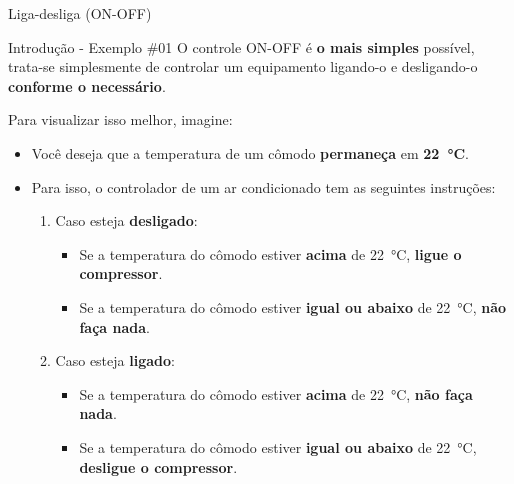\begin{frame}{Liga-desliga (ON-OFF)}
	\begin{block}{Introdução - Exemplo \#01}
		O controle ON-OFF é \textbf{o mais simples} possível, trata-se simplesmente de controlar um equipamento ligando-o e desligando-o \textbf{conforme o necessário}.
		
		\smallskip
		
		Para visualizar isso melhor, imagine:
		\begin{itemize}
			\item Você deseja que a temperatura de um cômodo \textbf{permaneça} em \textbf{\SI{22}{\degreeCelsius}}.
			\item Para isso, o controlador de um ar condicionado tem as seguintes instruções:
			\begin{enumerate}
				\item \normalsize Caso esteja \textbf{desligado}:
				\begin{itemize}
					\item \small Se a temperatura do cômodo estiver \textbf{acima} de \SI{22}{\degreeCelsius}, \textbf{ligue o compressor}.
					\item \small Se a temperatura do cômodo estiver \textbf{igual ou abaixo} de \SI{22}{\degreeCelsius}, \textbf{não faça nada}.
				\end{itemize}
				\item \normalsize Caso esteja \textbf{ligado}:
				\begin{itemize}
					\item \small Se a temperatura do cômodo estiver \textbf{acima} de \SI{22}{\degreeCelsius}, \textbf{não faça nada}.
					\item \small Se a temperatura do cômodo estiver \textbf{igual ou abaixo} de \SI{22}{\degreeCelsius}, \textbf{desligue o compressor}.
				\end{itemize}
			\end{enumerate}
			
		\end{itemize}
	\end{block}
\end{frame}


